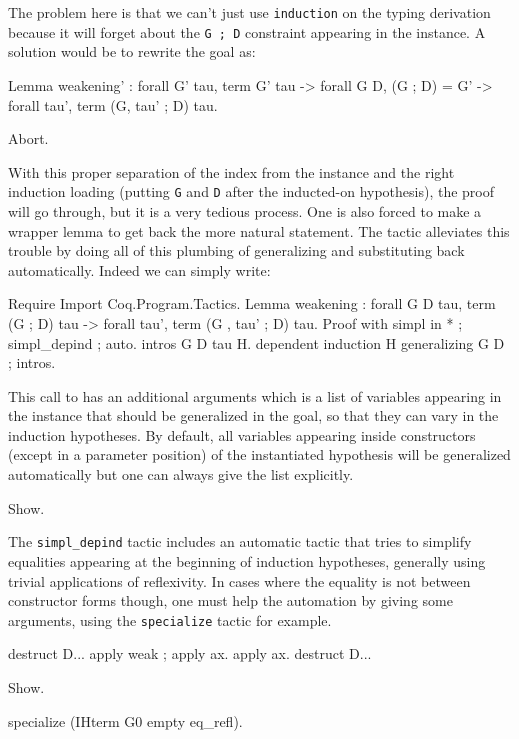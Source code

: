 The problem here is that we can't just use {\tt induction} on the typing
derivation because it will forget about the {\tt G ; D} constraint
appearing in the instance. A solution would be to rewrite the goal as:
\begin{coq_example*}
Lemma weakening' : forall G' tau, term G' tau -> 
  forall G D, (G ; D) = G' ->
  forall tau', term (G, tau' ; D) tau.
\end{coq_example*}
\begin{coq_eval}
  Abort.
\end{coq_eval}

With this proper separation of the index from the instance and the right
induction loading (putting {\tt G} and {\tt D} after the inducted-on
hypothesis), the proof will go through, but it is a very tedious
process. One is also forced to make a wrapper lemma to get back the
more natural statement. The \depind tactic alleviates this trouble by
doing all of this plumbing of generalizing and substituting back automatically.
Indeed we can simply write:

\begin{coq_example*}
Require Import Coq.Program.Tactics.
Lemma weakening : forall G D tau, term (G ; D) tau -> 
  forall tau', term (G , tau' ; D) tau.
Proof with simpl in * ; simpl_depind ; auto.
  intros G D tau H. dependent induction H generalizing G D ; intros.
\end{coq_example*}

This call to \depind has an additional arguments which is a list of
variables appearing in the instance that should be generalized in the
goal, so that they can vary in the induction hypotheses. By default, all
variables appearing inside constructors (except in a parameter position)
of the instantiated hypothesis will be generalized automatically but
one can always give the list explicitly.

\begin{coq_example}
  Show.
\end{coq_example}

The {\tt simpl\_depind} tactic includes an automatic tactic that tries
to simplify equalities appearing at the beginning of induction
hypotheses, generally using trivial applications of
reflexivity. In cases where the equality is not between constructor
forms though, one must help the automation by giving
some arguments, using the {\tt specialize} tactic for example.

\begin{coq_example*}
destruct D... apply weak ; apply ax. apply ax.
destruct D...
\end{coq_example*}
\begin{coq_example}
Show.
\end{coq_example}
\begin{coq_example}
  specialize (IHterm G0 empty eq_refl).
\end{coq_example}

